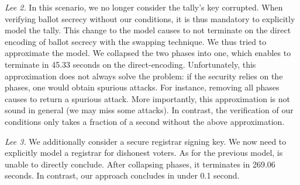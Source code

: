 \noindent
\textit{Lee 2.}
In this scenario, we no longer consider the tally's key corrupted. When verifying ballot secrecy without our conditions, it is thus mandatory
to explicitly model the tally. This change to the model causes \proverif
to not terminate on the direct encoding of ballot secrecy with the swapping technique. 
%
We thus tried 
to approximate the model. We collapsed the two phases into one, which
enables \proverif to terminate in 45.33 seconds on the direct-encoding.
Unfortunately, this approximation does not always solve the problem: if the
security relies on the phases, one would obtain spurious attacks. For
instance, removing all phases causes
\proverif to return a spurious attack. More importantly, this approximation
is not sound in general (we may miss some attacks).
%
In contrast, the verification of our conditions
only takes a fraction of a second without the above approximation.

\noindent
\textit{Lee 3.} %
We additionally consider a
secure registrar signing key.  We now need to explicitly
model a registrar for dishonest voters.  As for the previous
model, \proverif is unable to directly conclude.  After
collapsing phases, it terminates in 269.06 seconds. In contrast, our
approach concludes in under 0.1 second.

